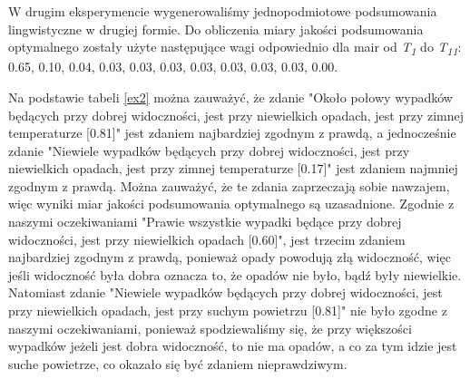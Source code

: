 \documentclass{classrep}
\begin{document}
W drugim eksperymencie wygenerowaliśmy jednopodmiotowe podsumowania lingwistyczne w drugiej formie. Do obliczenia miary jakości podsumowania optymalnego zostały użyte następujące wagi odpowiednio dla mair od \textit{T\textsubscript{1}} do \textit{T\textsubscript{11}}: 0.65, 0.10, 0.04, 0.03, 0.03, 0.03, 0.03, 0.03, 0.03, 0.03, 0.00.

Na podstawie tabeli \ref{ex2} można zauważyć, że zdanie "Około połowy wypadków będących przy dobrej widoczności, jest przy niewielkich opadach, jest przy zimnej temperaturze [0.81]" jest zdaniem najbardziej zgodnym z prawdą, a jednocześnie zdanie "Niewiele wypadków będących przy dobrej widoczności, jest przy niewielkich opadach, jest przy zimnej temperaturze [0.17]" jest zdaniem najmniej zgodnym z prawdą. Można zauważyć, że te zdania zaprzeczają sobie nawzajem, więc wyniki miar jakości podsumowania optymalnego są uzasadnione. Zgodnie z naszymi oczekiwaniami "Prawie wszystkie wypadki będące przy dobrej widoczności, jest przy niewielkich opadach [0.60]", jest trzecim zdaniem najbardziej zgodnym z prawdą, ponieważ opady powodują złą widoczność, więc jeśli widoczność była dobra oznacza to, że opadów nie było, bądź były niewielkie. Natomiast zdanie "Niewiele wypadków będących przy dobrej widoczności, jest przy niewielkich opadach, jest przy suchym powietrzu [0.81]" nie było zgodne z naszymi oczekiwaniami, ponieważ spodziewaliśmy się, że przy większości wypadków jeżeli jest dobra widoczność, to nie ma opadów, a co za tym idzie jest suche powietrze, co okazało się być zdaniem nieprawdziwym.

\newpage
\end{document}
